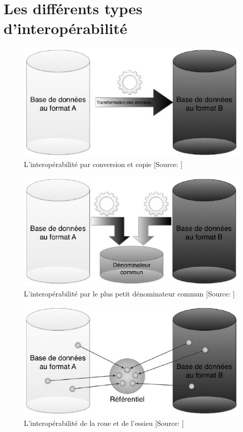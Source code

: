 \chapter{\label{annexe_types_interop}Les différents types d'interopérabilité}

\begin{figure}[!h]
	\centering
	\includegraphics[width=12cm]{images/interop_conversion_copie.jpeg}
	\medskip
	\caption[L'interopérabilité par conversion et copie]{L'interopérabilité par conversion et copie [Source: \cite{bermes_2_2013}]}
	\label{conversion}
\end{figure}

\begin{figure}[!h]
	\centering
	\includegraphics[width=12cm]{images/interop_denom_commun.jpeg}
	\medskip
	\caption[L'interopérabilité par le plus petit dénominateur commun]{L'interopérabilité par le plus petit dénominateur commun [Source: \cite{bermes_2_2013}]}
	\label{denom}
\end{figure}

\begin{figure}[!h]
\centering
\includegraphics[width=12cm]{images/interop_hub_spoke.jpeg}
\medskip
\caption[L'interopérabilité de le roue et de l'essieu]{L'interopérabilité de la roue et de l'essieu [Source: \cite{bermes_2_2013}]}
\label{hub_spoke}
\end{figure}

